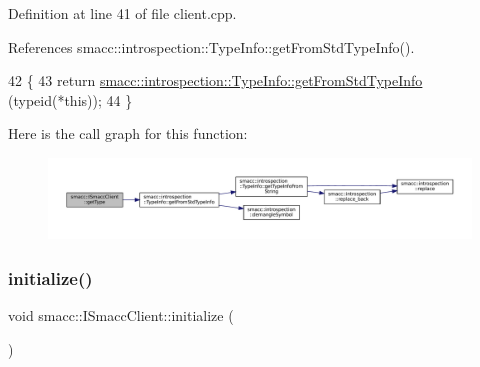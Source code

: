 Definition at line 41 of file client.\+cpp.



References smacc\+::introspection\+::\+Type\+Info\+::get\+From\+Std\+Type\+Info().


\begin{DoxyCode}
42 \{
43     \textcolor{keywordflow}{return} \hyperlink{classsmacc_1_1introspection_1_1TypeInfo_ada1e604cd8bf968a5f816fbace4af881}{smacc::introspection::TypeInfo::getFromStdTypeInfo}
      (\textcolor{keyword}{typeid}(*\textcolor{keyword}{this}));
44 \}
\end{DoxyCode}
Here is the call graph for this function\+:
\nopagebreak
\begin{figure}[H]
\begin{center}
\leavevmode
\includegraphics[width=350pt]{classsmacc_1_1ISmaccClient_ae7faf4e40510c73810e6b0ef9fec8f33_cgraph}
\end{center}
\end{figure}
\mbox{\label{classsmacc_1_1ISmaccClient_a974ebb6ad6cf812e7b9de6b78b3d901f}} 
\subsubsection{\texorpdfstring{initialize()}{initialize()}}
{\footnotesize\ttfamily void smacc\+::\+I\+Smacc\+Client\+::initialize (\begin{DoxyParamCaption}{ }\end{DoxyParamCaption})\hspace{0.3cm}{\ttfamily [virtual]}}



